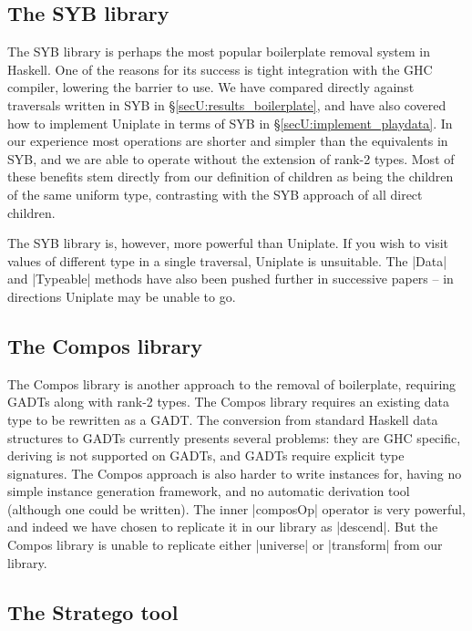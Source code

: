\subsection{The SYB library}

The SYB library \citep{lammel:syb} is perhaps the most popular boilerplate removal system in Haskell. One of the reasons for its success is tight integration with the GHC compiler, lowering the barrier to use. We have compared directly against traversals written in SYB in \S\ref{secU:results_boilerplate}, and have also covered how to implement Uniplate in terms of SYB in \S\ref{secU:implement_playdata}. In our experience most operations are shorter and simpler than the equivalents in SYB, and we are able to operate without the extension of rank-2 types. Most of these benefits stem directly from our definition of children as being the children of the same uniform type, contrasting with the SYB approach of all direct children.

The SYB library is, however, more powerful than Uniplate. If you wish to visit values of different type in a single traversal, Uniplate is unsuitable. The |Data| and |Typeable| methods have also been pushed further in successive papers \citep{lammel:syb2,lammel:syb3} -- in directions Uniplate may be unable to go. 

\subsection{The Compos library}

The Compos library \citep{bringert:compos} is another approach to the removal of boilerplate, requiring GADTs \citep{spj:gadt} along with rank-2 types. The Compos library requires an existing data type to be rewritten as a GADT. The conversion from standard Haskell data structures to GADTs currently presents several problems: they are GHC specific, deriving is not supported on GADTs, and GADTs require explicit type signatures. The Compos approach is also harder to write instances for, having no simple instance generation framework, and no automatic derivation tool (although one could be written). The inner |composOp| operator is very powerful, and indeed we have chosen to replicate it in our library as |descend|. But the Compos library is unable to replicate either |universe| or |transform| from our library.

\subsection{The Stratego tool}

